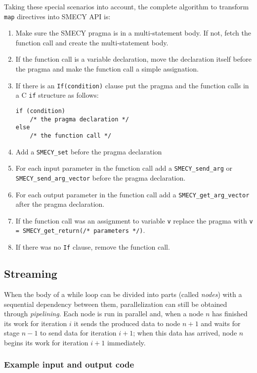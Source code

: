 \documentclass[a4paper]{article}
\begin{document}
	Taking these special scenarios into account, the complete algorithm to transform \verb+map+ directives into SMECY API is:
	\begin{enumerate}
		\item Make sure the SMECY pragma is in a multi-statement body. If not, fetch the function call and create the multi-statement body.
		\item If the function call is a variable declaration, move the declaration itself before the pragma and make the function call a simple assignation.
		\item If there is an \verb+If(condition)+ clause put the pragma and the function calls in a C \verb+if+ structure as follows:
		\begin{lstlisting}[frame=none, numbers=none]
if (condition)
	/* the pragma declaration */
else
	/* the function call */
		\end{lstlisting}
		\item Add a \verb+SMECY_set+ before the pragma declaration
		\item For each input parameter in the function call add a \verb+SMECY_send_arg+ or \verb+SMECY_send_arg_vector+ before the pragma declaration.
		\item For each output parameter in the function call add a \verb+SMECY_get_arg_vector+ after the pragma declaration.
		\item If the function call was an assignment to variable \verb+v+ replace the pragma with \verb+v = SMECY_get_return(/* parameters */)+.
		\item If there was no \verb+If+ clause, remove the function call.
	\end{enumerate}

	\subsection{Streaming}
	When the body of a while loop can be divided into parts (called \emph{nodes}) with a sequential dependency between them, parallelization can still be obtained through \emph{pipelining}. Each node is run in parallel and, when a node $n$ has finished its work for iteration $i$ it sends the produced data to node $n+1$ and waits for stage $n-1$ to send data for iteration $i+1$; when this data has arrived, node $n$ begins its work for iteration $i+1$ immediately.
	
	\subsubsection{Example input and output code}
	
\end{document}
